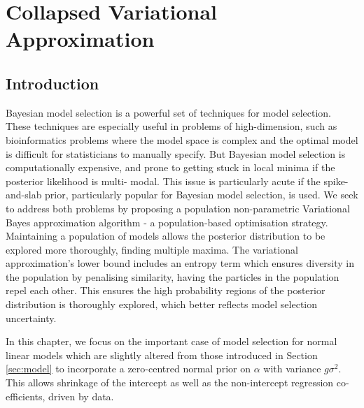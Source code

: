 \chapter{Collapsed Variational Approximation}

\setlength{\parindent}{0pt}

\section{Introduction}

Bayesian model selection is a powerful set of techniques for model selection. These techniques are especially
useful in problems of high-dimension, such as bioinformatics problems where the model space is complex and the
optimal model is difficult for statisticians to manually specify. But Bayesian model selection is
computationally expensive, and prone to getting stuck in local minima if the posterior likelihood is multi-
modal. This issue is particularly acute if the spike-and-slab prior, particularly popular for Bayesian model
selection, is used. We seek to address both problems by proposing a population non-parametric Variational
Bayes approximation algorithm - a population-based optimisation strategy. Maintaining a population of models
allows the posterior distribution to be explored more thoroughly, finding multiple maxima. The variational
approximation's lower bound includes an entropy term which ensures diversity in the population by penalising
similarity,  having the particles in the population repel each other. This ensures the high probability
regions of the posterior distribution is thoroughly explored, which better reflects model selection
uncertainty.

In this chapter, we focus on the important case of model selection for normal linear models which
are slightly altered from those introduced in Section \ref{sec:model} to incorporate a zero-centred normal
prior on $\alpha$ with variance $g \sigma^2$. This allows shrinkage of the intercept as well as the
non-intercept regression co-efficients, driven by data.

